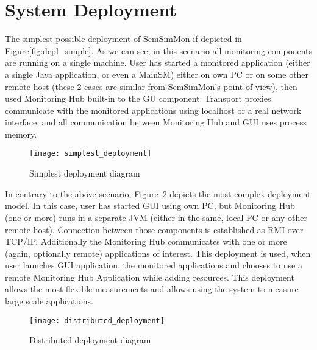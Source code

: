 %


\section{System Deployment}
\label{sec:deployments}

The simplest possible deployment of SemSimMon if depicted in Figure\ref{fig:depl_simple}. As we can see, in this scenario all monitoring components are running on a single machine. User has started a monitored application (either a single Java application, or even a MainSM) either on own PC or on some other remote host (these 2 cases are similar from SemSimMon\rq{}s point of view), then used Monitoring Hub built-in to the GU component. Transport proxies communicate with the monitored applications using localhost or a real network interface, and all communication between Monitoring Hub and GUI uses process memory.

\begin{figure}[h]
   \centering
   \texttt{[image: simplest\_deployment]}
   \caption{Simplest deployment diagram}
   \label{fib:depl_simple}
 \end{figure}
 
In contrary to the above scenario, Figure~\ref{fig:depl_complex} depicts the most complex deployment model. In this case, user has started GUI using own PC, but Monitoring Hub (one or more) runs in a separate JVM (either in the same, local PC or any other remote host). Connection between those components is established as RMI over TCP/IP. Additionally the Monitoring Hub communicates with one or more (again, optionally remote) applications of interest. This deployment is used, when user launches GUI application, the monitored applications and chooses to use a remote Monitoring Hub Application while adding resources. This deployment allows the most flexible measurements and allows using the system to measure large scale applications.

\begin{figure}[h]
   \centering
   \texttt{[image: distributed\_deployment]}
   \caption{Distributed deployment diagram}
   \label{fig:depl_complex}
 \end{figure}
